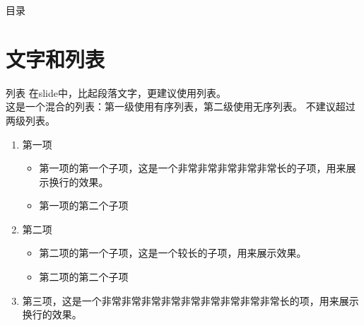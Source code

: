 \documentclass[aspectratio=169]{beamer}
\begin{document}

\begin{frame}
    \titlepage
\end{frame}

\begin{frame}{目录}
    \tableofcontents[sectionstyle=show]
\end{frame}


\section{文字和列表}

\begin{frame}{列表}
    在slide中，比起段落文字，更建议使用列表。\\
    这是一个混合的列表：第一级使用有序列表，第二级使用无序列表。
    不建议超过两级列表。
    \begin{enumerate}
        \item 第一项
        \begin{itemize}
            \item 第一项的第一个子项，这是一个非常非常非常非常非常长的子项，用来展示换行的效果。
            \item 第一项的第二个子项
        \end{itemize}
        \item 第二项
        \begin{itemize}
            \item 第二项的第一个子项，这是一个较长的子项，用来展示效果。
            \item 第二项的第二个子项
        \end{itemize}
        \item 第三项，这是一个非常非常非常非常非常非常非常非常非常长的项，用来展示换行的效果。
    \end{enumerate}
\end{frame}
\end{document}
